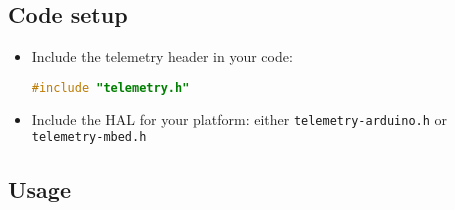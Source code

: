 \documentclass[11pt]{article}
\begin{document}
\subsection{Code setup}
\begin{itemize}
  \item Include the telemetry header in your code:
  \begin{lstlisting}[language=C++]
#include "telemetry.h"
  \end{lstlisting}
  \item Include the HAL for your platform: either \texttt{telemetry-arduino.h} or \texttt{telemetry-mbed.h}
\end{itemize}

\subsection{Usage}
\end{document}
